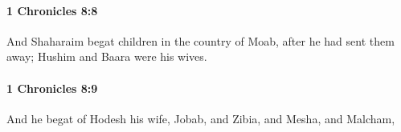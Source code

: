 		\paragraph{1 Chronicles 8:8} %
			\label{1CHRONICLES-8-8}

			And Shaharaim begat children in the country of Moab, after he had sent them away; Hushim and Baara were his wives.


		\paragraph{1 Chronicles 8:9} %
			\label{1CHRONICLES-8-9}

			And he begat of Hodesh his wife, Jobab, and Zibia, and Mesha, and Malcham,


